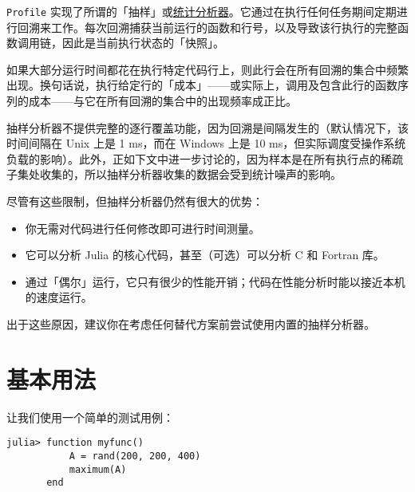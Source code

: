 \texttt{Profile} 实现了所谓的「抽样」或\href{https://en.wikipedia.org/wiki/Profiling\_(computer\_programming)}{统计分析器}。它通过在执行任何任务期间定期进行回溯来工作。每次回溯捕获当前运行的函数和行号，以及导致该行执行的完整函数调用链，因此是当前执行状态的「快照」。



如果大部分运行时间都花在执行特定代码行上，则此行会在所有回溯的集合中频繁出现。换句话说，执行给定行的「成本」——或实际上，调用及包含此行的函数序列的成本——与它在所有回溯的集合中的出现频率成正比。



抽样分析器不提供完整的逐行覆盖功能，因为回溯是间隔发生的（默认情况下，该时间间隔在 Unix 上是 1 ms，而在 Windows 上是 10 ms，但实际调度受操作系统负载的影响）。此外，正如下文中进一步讨论的，因为样本是在所有执行点的稀疏子集处收集的，所以抽样分析器收集的数据会受到统计噪声的影响。



尽管有这些限制，但抽样分析器仍然有很大的优势：



\begin{itemize}
\item 你无需对代码进行任何修改即可进行时间测量。


\item 它可以分析 Julia 的核心代码，甚至（可选）可以分析 C 和 Fortran 库。


\item 通过「偶尔」运行，它只有很少的性能开销；代码在性能分析时能以接近本机的速度运行。

\end{itemize}


出于这些原因，建议你在考虑任何替代方案前尝试使用内置的抽样分析器。



\hypertarget{17553054695497272357}{}


\section{基本用法}



让我们使用一个简单的测试用例：




\begin{verbatim}
julia> function myfunc()
           A = rand(200, 200, 400)
           maximum(A)
       end
\end{verbatim}



